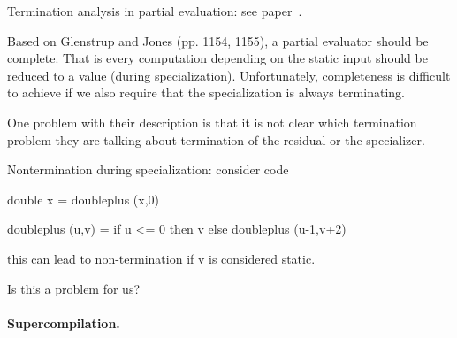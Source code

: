 Termination analysis in partial evaluation: see paper~\cite{AH96,GJ05}.

Based on Glenstrup and Jones (pp. 1154, 1155), a partial evaluator
should be complete. That is every computation depending on the static
input should be reduced to a value (during specialization).
Unfortunately, completeness is difficult to achieve if we also require
that the specialization is always terminating.

One problem with their description is that it is not clear which
termination problem they are talking about termination of the residual
or the specializer. 

Nontermination during specialization: 
consider code

double x = doubleplus (x,0) 

doubleplus (u,v) = if u <= 0 then v else doubleplus (u-1,v+2)

this can lead to non-termination if v is considered static.  

Is this a problem for us? 



\paragraph{Supercompilation.}
~\cite{Turchin86}

